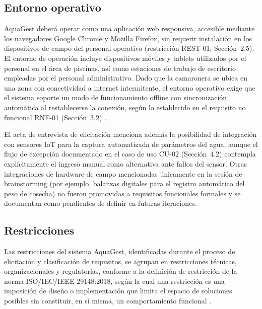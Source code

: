 \documentclass[12pt,a4paper]{article}
\begin{document}
\subsection{Entorno operativo}

AquaGest deberá operar como una aplicación web responsiva, accesible mediante
los navegadores Google Chrome y Mozilla Firefox, sin requerir instalación en los
dispositivos de campo del personal operativo (restricción REST-01,
Sección~2.5). El entorno de operación incluye dispositivos móviles y tablets
utilizados por el personal en el área de piscinas, así como estaciones de
trabajo de escritorio empleadas por el personal administrativo. Dado que la
camaronera se ubica en una zona con conectividad a internet intermitente, el
entorno operativo exige que el sistema soporte un modo de funcionamiento
offline con sincronización automática al restablecerse la conexión, según lo
establecido en el requisito no funcional RNF-01 (Sección~3.2)
\cite{Pohl2010,ISO25010:2023}.

El acta de entrevista de elicitación menciona además la posibilidad de
integración con sensores IoT para la captura automatizada de parámetros del
agua, aunque el flujo de excepción documentado en el caso de uso CU-02
(Sección~4.2) contempla explícitamente el ingreso manual como alternativa ante
fallos del sensor. Otras integraciones de hardware de campo mencionadas
únicamente en la sesión de brainstorming (por ejemplo, balanzas digitales para
el registro automático del peso de cosecha) no fueron promovidas a requisitos
funcionales formales y se documentan como pendientes de definir en futuras
iteraciones.

\subsection{Restricciones}

Las restricciones del sistema AquaGest, identificadas durante el proceso de
elicitación y clasificación de requisitos, se agrupan en restricciones
técnicas, organizacionales y regulatorias, conforme a la definición de
restricción de la norma ISO/IEC/IEEE 29148:2018, según la cual una restricción
es una imposición de diseño o implementación que limita el espacio de
soluciones posibles sin constituir, en sí misma, un comportamiento funcional
\cite{ISO29148:2018}.
\end{document}
